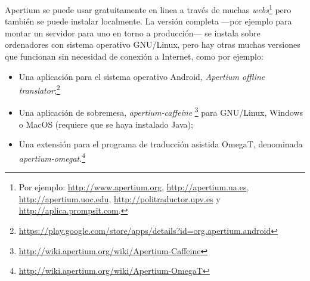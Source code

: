 {Apertium se puede usar gratuitamente en linea a través de muchas \emph{webs}\footnote{Por ejemplo: \url{http://www.apertium.org}, \url{http://apertium.ua.es}, \url{http://apertium.uoc.edu}, \url{http://politraductor.upv.es} y \url{http://aplica.prompsit.com}.}  pero también se puede instalar localmente. La versión completa ---por ejemplo para montar un servidor para uno en torno a producción--- se instala sobre ordenadores con sistema operativo GNU/Linux, pero hay otras muchas versiones que funcionan sin necesidad de conexión a Internet, como por ejemplo: \begin{itemize} \item Una aplicación para el sistema operativo Android, \emph{Apertium offline translator};\footnote{\url{https://play.google.com/store/apps/details?id=org.apertium.android}} \item Una aplicación de sobremesa, \emph{apertium-caffeine} \footnote{\url{http://wiki.apertium.org/wiki/Apertium-Caffeine}} para GNU/Linux, Windows o MacOS (requiere que se  haya instalado Java); \item Una extensión para el programa de traducción asistida OmegaT, denominada \emph{apertium-omegat}.\footnote{\url{http://wiki.apertium.org/wiki/Apertium-OmegaT}} \end{itemize} 

}
